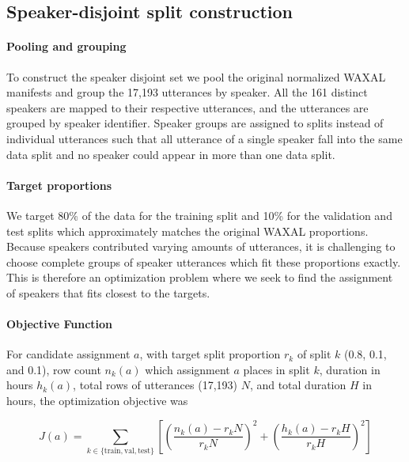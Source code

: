 {\subsection{Speaker-disjoint split construction}

\paragraph{Pooling and grouping}

To construct the speaker disjoint set we pool the original normalized WAXAL manifests and group the 17,193 utterances by speaker. All the 161 distinct speakers are mapped to their respective utterances, and the utterances are grouped by speaker identifier. Speaker groups are assigned to splits instead of individual utterances such that all utterance of a single speaker fall into the same data split and no speaker could appear in more than one data split.

\paragraph{Target proportions}

We target 80\% of the data for the training split and 10\% for the validation and test splits which approximately matches the original WAXAL proportions. Because speakers contributed varying amounts of utterances, it is challenging to choose complete groups of speaker utterances which fit these proportions exactly. This is therefore an optimization problem where we seek to find the assignment of speakers that fits closest to the targets.

\paragraph{Objective Function}

For candidate assignment $a$, with target split proportion $r_k$ of split $k$ (0.8, 0.1, and 0.1), row count $n_k (a)$ which assignment $a$ places in split $k$, duration in hours $h_k (a)$, total rows  of utterances (17,193) $N$, and total duration $H$ in hours, the optimization objective was

\begin{equation}
J(a) = \sum_{k \in \{\text{train}, \text{val}, \text{test}\}} \left[ \left( \frac{n_k(a) - r_k N}{r_k N} \right)^2 + \left( \frac{h_k(a) - r_k H}{r_k H} \right)^2 \right]
\label{split-objective}
\end{equation}

}
